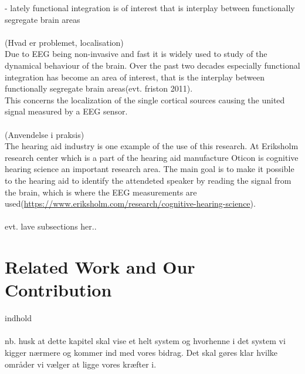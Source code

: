 - lately functional integration is of interest that is interplay between functionally segregate brain areas\\ 
\\
(Hvad er problemet, localisation)\\
Due to EEG being non-invasive and fast it is widely used to study of the dynamical behaviour of the brain. Over the past two decades especially functional integration has become an area of interest, that is the interplay between functionally segregate brain areas\cite{Van2019}(evt. friston 2011).  \\
This concerns the localization of the single cortical sources causing the united signal measured by a EEG sensor.\\ 
\\  
(Anvendelse i praksis)\\
The hearing aid industry is one example of the use of this research. At Eriksholm research center which is a part of the hearing aid manufacture Oticon is cognitive hearing science an important research area. The main goal is to make it possible to the hearing aid to identify the attendeted speaker by reading the signal from the brain, which is where the EEG measurements are used(\url{https://www.eriksholm.com/research/cognitive-hearing-science}). \\
\\
 

evt. lave subsections her..

\section{Related Work and Our Contribution } 
indhold
\\
\\
nb. husk at dette kapitel skal vise et helt system og hvorhenne i det system vi kigger nærmere og kommer ind med vores bidrag. Det skal gøres klar hvilke områder vi vælger at ligge vores kræfter i.  





 
